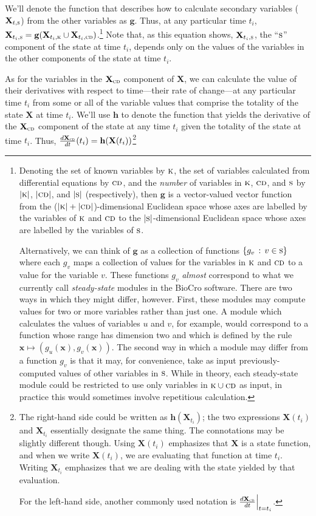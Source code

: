 \documentclass{article}
\newcommand{\boldX}{\mathbf{X}}
\newcommand{\cd}{\textsc{cd}}
\newcommand{\kn}{\textsc{k}} %
\newcommand{\s}{\textsc{s}} %
\newcommand{\g}{\mathbf{g}}
\newcommand{\h}{\mathbf{h}}
\begin{document}
We'll denote the function that describes how to calculate secondary
variables ($\boldX_{t,\s}$) from the other variables as $\g$. Thus, at
any particular time $t_i$, $\boldX_{t_i,\s} = \g(\boldX_{t_i,\kn} \cup
\boldX_{t_i,\cd})$.\footnote{Denoting the set of known variables by
  $\kn$, the set of variables calculated from differential equations
  by $\cd$, and the \emph{number} of variables in $\kn$, $\cd$, and
  $\s$ by $|\kn|$, $|\cd|$, and $|\s|$ (respectively), then
  $\mathbf{g}$ is a vector-valued vector function from the
  ($|\kn|+|\cd|$)-dimensional Euclidean space whose axes are labelled
  by the variables of $\kn$ and $\cd$ to the $|\s|$-dimensional
  Euclidean space whose axes are labelled by the variables of $\s$.

  Alternatively, we can think of $\mathbf{g}$ as a collection of
  functions $\{g_v\,:\,v\in \s\}$ where each $g_v$ maps a collection
  of values for the variables in $\kn$ and $\cd$ to a value for the
  variable $v$.  These functions $g_v$ \emph{almost} correspond to
  what we currently call \emph{steady-state} modules in the BioCro
  software.  There are two ways in which they might differ, however.
  First, these modules may compute values for two or more variables
  rather than just one.  A module which calculates the values of
  variables $u$ and $v$, for example, would correspond to a function
  whose range has dimension two and which is defined by the rule
  $\mathbf{x}\mapsto(g_u(\mathbf{x}), g_v(\mathbf{x}))$.  The second
  way in which a module may differ from a function $g_v$ is that it
  may, for convenience, take as input previously-computed values of
  other variables in $\s$.  While in theory, each steady-state module
  could be restricted to use only variables in $\kn \cup \cd$ as
  input, in practice this would sometimes involve repetitious
  calculation.}  Note that, as this equation shows, $\boldX_{t_i,\s}$,
the ``$\s$'' component of the state at time $t_i$, depends only on the
values of the variables in the other components of the state at time
$t_i$.

As for the variables in the $\boldX_\cd$ component of $\boldX$, we can
calculate the value of their derivatives with respect to time---their
rate of change---at any particular time $t_i$ from some or all of the
variable values that comprise the totality of the state $\boldX$ at
time $t_i$.  We'll use $\h$ to denote the function that yields the
derivative of the $\boldX_\cd$ component of the state at any time
$t_i$ given the totality of the state at time $t_i$.  Thus,
$\frac{d\boldX_\cd}{dt}(t_i) = \h(\boldX(t_i))$\footnote{The
  right-hand side could be written as $\h(\boldX_{t_i})$; the two
  expressions $\boldX(t_i)$ and $\boldX_{t_i}$ essentially designate
  the same thing.  The connotations may be slightly different though.
  Using $\boldX(t_i)$ emphasizes that $\boldX$ is a state function,
  and when we write $\boldX(t_i)$, we are evaluating that function at
  time $t_i$. Writing $\boldX_{t_i}$ emphasizes that we are dealing
  with the state yielded by that evaluation.

For the left-hand side, another commonly used notation is
$\frac{d\boldX_\cd}{dt}{\Big\vert}_{t=t_i}$.}
\end{document}
